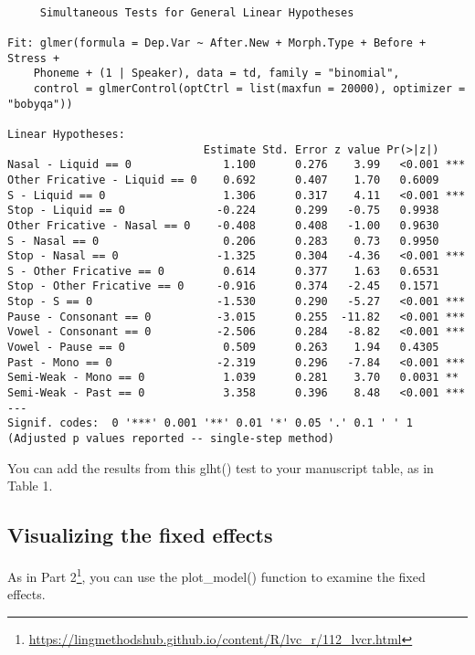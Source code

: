 \documentclass[
  10pt,
  letterpaper]{article}
\renewcommand\texttt[1]{{\ttfamily\color{BrickRed}#1}}
\DeclareRobustCommand{\href}[2]{#2\footnote{\url{#1}}}
\begin{document}
\begin{verbatim}

     Simultaneous Tests for General Linear Hypotheses

Fit: glmer(formula = Dep.Var ~ After.New + Morph.Type + Before + Stress + 
    Phoneme + (1 | Speaker), data = td, family = "binomial", 
    control = glmerControl(optCtrl = list(maxfun = 20000), optimizer = "bobyqa"))

Linear Hypotheses:
                              Estimate Std. Error z value Pr(>|z|)    
Nasal - Liquid == 0              1.100      0.276    3.99   <0.001 ***
Other Fricative - Liquid == 0    0.692      0.407    1.70   0.6009    
S - Liquid == 0                  1.306      0.317    4.11   <0.001 ***
Stop - Liquid == 0              -0.224      0.299   -0.75   0.9938    
Other Fricative - Nasal == 0    -0.408      0.408   -1.00   0.9630    
S - Nasal == 0                   0.206      0.283    0.73   0.9950    
Stop - Nasal == 0               -1.325      0.304   -4.36   <0.001 ***
S - Other Fricative == 0         0.614      0.377    1.63   0.6531    
Stop - Other Fricative == 0     -0.916      0.374   -2.45   0.1571    
Stop - S == 0                   -1.530      0.290   -5.27   <0.001 ***
Pause - Consonant == 0          -3.015      0.255  -11.82   <0.001 ***
Vowel - Consonant == 0          -2.506      0.284   -8.82   <0.001 ***
Vowel - Pause == 0               0.509      0.263    1.94   0.4305    
Past - Mono == 0                -2.319      0.296   -7.84   <0.001 ***
Semi-Weak - Mono == 0            1.039      0.281    3.70   0.0031 ** 
Semi-Weak - Past == 0            3.358      0.396    8.48   <0.001 ***
---
Signif. codes:  0 '***' 0.001 '**' 0.01 '*' 0.05 '.' 0.1 ' ' 1
(Adjusted p values reported -- single-step method)
\end{verbatim}

You can add the results from this \texttt{glht()} test to your
manuscript table, as in Table 1.

\hypertarget{visualizing-the-fixed-effects}{%
\subsection{Visualizing the fixed
effects}\label{visualizing-the-fixed-effects}}

As in
\href{https://lingmethodshub.github.io/content/R/lvc_r/112_lvcr.html}{Part
2}, you can use the \texttt{plot\_model()} function to examine the fixed
effects.
\end{document}
